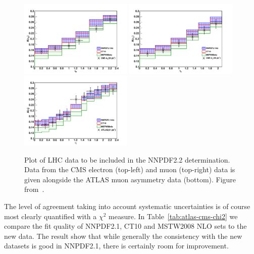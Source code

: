 \begin{figure}[h!]
  \centering
  \includegraphics[width=0.48\textwidth]{6-LHCimpact/figs/cms_el_25pt.pdf}
  \includegraphics[width=0.48\textwidth]{6-LHCimpact/figs/cms_mu_25pt.pdf}\\
    \includegraphics[width=0.48\textwidth]{6-LHCimpact/figs/atlas.pdf}

  \caption[Plot of LHC data to be included in the NNPDF2.2 determination. ]{Plot of LHC data to be included in the NNPDF2.2 determination. Data from the CMS electron (top-left) and muon (top-right) data is given alongside the ATLAS muon asymmetry data (bottom). Figure from~\cite{Ball:2011gg}.}
  \label{fig:22LHCdat}
\end{figure}

The level of agreement taking into account systematic uncertainties is of course most clearly quantified with a $\chi^2$ measure. In Table~\ref{tab:atlas-cms-chi2} we compare the fit quality of NNPDF2.1, CT10 and MSTW2008 NLO sets to the new data. The result show that while generally the consistency with the new datasets is good in NNPDF2.1, there is certainly room for improvement.


